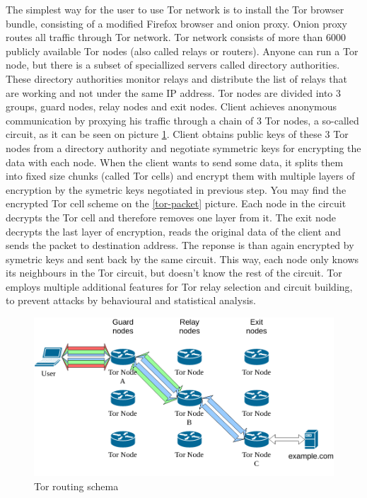 \documentclass[
  digital, %
  table,   %
  lof,     %
  lot,     %
  oneside
]{fithesis3}
\begin{document}
The simplest way for the user to use Tor network is to install the Tor browser bundle, consisting of
a modified Firefox browser and onion proxy. Onion proxy routes all traffic through Tor network.
Tor network consists of more than 6000 publicly available Tor nodes (also called relays or routers).
Anyone can run a Tor node, but there is a subset of speciallized servers called directory authorities.
These directory authorities monitor relays and distribute the list of relays that are working and 
not under the same IP address.
Tor nodes are divided into 3 groups, guard nodes, relay nodes and exit nodes.
Client achieves anonymous communication by proxying his traffic through
a chain of 3 Tor nodes, a so-called circuit, as it can be seen on picture \ref{tor}.
Client obtains public keys of these 3 Tor nodes from a directory authority and negotiate
symmetric keys for encrypting the data with each node.
When the client wants to send some data, it splits them into fixed size chunks
(called Tor cells) and encrypt them with multiple layers of encryption by the symetric keys negotiated in previous step.
You may find the encrypted Tor cell scheme on the \ref{tor-packet} picture.
Each node in the circuit decrypts the Tor cell and therefore removes one layer from it.
The exit node decrypts the last layer of encryption, reads the original data of the client and 
sends the packet to destination address. The reponse is than again encrypted by symetric keys
and sent back by the same circuit.
This way, each node only knows its neighbours in the Tor circuit, but doesn't know the rest of the circuit.
Tor employs multiple additional features for Tor relay selection and circuit building, to prevent attacks
by behavioural and statistical analysis.
 
\begin{figure}[!htb]
    \centering
    \includegraphics[width=1\textwidth]{tor}
    \caption{Tor routing schema}
    \label{tor}
\end{figure}
 
\end{document}
